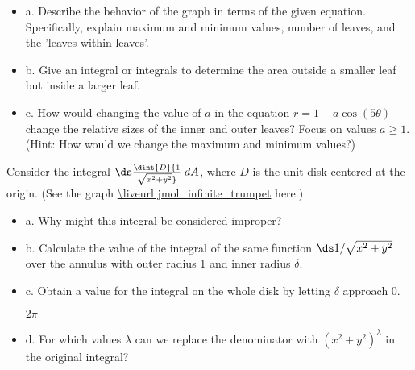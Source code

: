 \begin{exercises}
\begin{itemize} %

\item{a.} Describe the behavior of the graph in terms of the given
  equation.  Specifically, explain maximum and minimum values, number
  of leaves, and the 'leaves within leaves'.
 
\item{b.} Give an integral or integrals to determine the area outside a
  smaller leaf but inside a larger leaf.


\item{c.} How would changing the value of $a$ in the equation
  $r=1+a\cos(5\theta)$ change the relative sizes of the inner and
  outer leaves? Focus on values $a\geq 1$.  (Hint: How would we change
  the maximum and minimum values?)
 
\end{itemize}

\exercise Consider the integral $\ds\dint{D} {1\over\sqrt{x^2+y^2}} \;
dA$, where $D$ is the unit disk centered at the origin. (See the graph
\expandafter\url\expandafter{\liveurl jmol_infinite_trumpet}%
here\endurl.)

\begin{itemize} %

\item{a.} Why might this integral be considered improper?

\item{b.} Calculate the value of the integral of the same function
  $\ds 1/\sqrt{x^2+y^2}$ over the annulus with outer radius 1 and
  inner radius $\delta$.

\item{c.} Obtain a value for the integral on the whole disk by letting
  $\delta$ approach 0.
\begin{answer} $2\pi$
\end{answer}

\item{d.} For which values $\lambda$ can we replace the denominator with
  $(x^2+y^2)^\lambda$ in the original integral?

\end{itemize}

\end{exercises}
